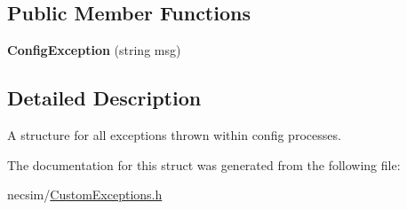 \subsection*{Public Member Functions}
\begin{DoxyCompactItemize}
\item 
{\bfseries Config\+Exception} (string msg)\hypertarget{struct_config_exception_ab480162a6c4fa7932b4d6906025172f1}{}\label{struct_config_exception_ab480162a6c4fa7932b4d6906025172f1}

\end{DoxyCompactItemize}


\subsection{Detailed Description}
A structure for all exceptions thrown within config processes. 

The documentation for this struct was generated from the following file\+:\begin{DoxyCompactItemize}
\item 
necsim/\hyperlink{_custom_exceptions_8h}{Custom\+Exceptions.\+h}\end{DoxyCompactItemize}
